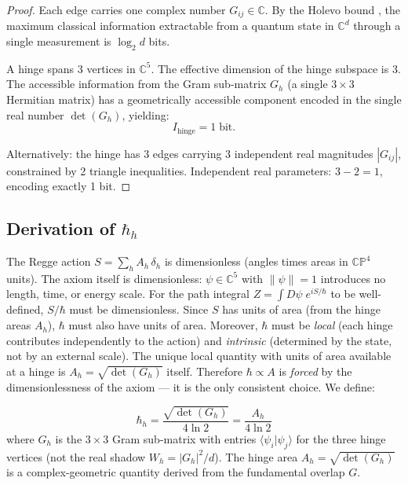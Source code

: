 \documentclass[12pt]{article}
\theoremstyle{remark}
\theoremstyle{definition}
\begin{document}
\begin{proof}
Each edge carries one complex number $G_{ij} \in \mathbb{C}$. By the Holevo bound \cite{Holevo}, the maximum classical information extractable from a quantum state in $\mathbb{C}^d$ through a single measurement is $\log_2 d$ bits.

A hinge spans 3 vertices in $\mathbb{C}^5$. The effective dimension of the hinge subspace is 3. The accessible information from the Gram sub-matrix $G_h$ (a single $3\times 3$ Hermitian matrix) has a geometrically accessible component encoded in the single real number $\det(G_h)$, yielding:
\begin{equation}
I_\text{hinge} = 1\;\text{bit}.
\end{equation}

Alternatively: the hinge has 3 edges carrying 3 independent real magnitudes $|G_{ij}|$, constrained by 2 triangle inequalities. Independent real parameters: $3 - 2 = 1$, encoding exactly 1 bit.
\end{proof}

\subsection{Derivation of $\hbar_h$}

The Regge action $S = \sum_h A_h\,\delta_h$ is dimensionless (angles times areas in $\mathbb{CP}^4$ units). The axiom itself is dimensionless: $\psi \in \mathbb{C}^5$ with $\|\psi\| = 1$ introduces no length, time, or energy scale. For the path integral $Z = \int D\psi\; e^{iS/\hbar}$ to be well-defined, $S/\hbar$ must be dimensionless. Since $S$ has units of area (from the hinge areas $A_h$), $\hbar$ must also have units of area. Moreover, $\hbar$ must be \emph{local} (each hinge contributes independently to the action) and \emph{intrinsic} (determined by the state, not by an external scale). The unique local quantity with units of area available at a hinge is $A_h = \sqrt{\det(G_h)}$ itself. Therefore $\hbar \propto A$ is \emph{forced} by the dimensionlessness of the axiom --- it is the only consistent choice. We define:

\begin{equation}
\boxed{\hbar_h = \frac{\sqrt{\det(G_h)}}{4\ln 2} = \frac{A_h}{4\ln 2}}
\label{eq:hbar}
\end{equation}
where $G_h$ is the $3 \times 3$ Gram sub-matrix with entries $\langle\psi_i|\psi_j\rangle$ for the three hinge vertices (not the real shadow $W_h = |G_h|^2/d$). The hinge area $A_h = \sqrt{\det(G_h)}$ is a complex-geometric quantity derived from the fundamental overlap $G$.
\end{document}
